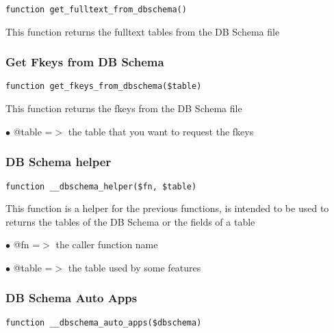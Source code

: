 \documentclass[a4paper]{article}
\begin{document}
\begin{lstlisting}
function get_fulltext_from_dbschema()
\end{lstlisting}

This function returns the fulltext tables from the DB Schema file

\hypertarget{toc419}{}
\subsubsection{Get Fkeys from DB Schema}

\begin{lstlisting}
function get_fkeys_from_dbschema($table)
\end{lstlisting}

This function returns the fkeys from the DB Schema file

\begin{compactitem}
\item[\color{myblue}$\bullet$] @table =$>$ the table that you want to request the fkeys
\end{compactitem}

\hypertarget{toc420}{}
\subsubsection{DB Schema helper}

\begin{lstlisting}
function __dbschema_helper($fn, $table)
\end{lstlisting}

This function is a helper for the previous functions, is intended to be used
to returns the tables of the DB Schema or the fields of a table

\begin{compactitem}
\item[\color{myblue}$\bullet$] @fn    =$>$ the caller function name
\item[\color{myblue}$\bullet$] @table =$>$ the table used by some features
\end{compactitem}

\hypertarget{toc421}{}
\subsubsection{DB Schema Auto Apps}

\begin{lstlisting}
function __dbschema_auto_apps($dbschema)
\end{lstlisting}
\end{document}
